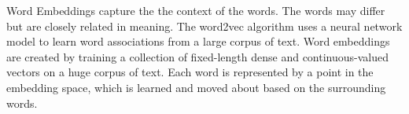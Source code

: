 Word Embeddings capture the the context of the words. The words may differ but are closely related in meaning. The word2vec algorithm uses a neural network model to learn word associations from a large corpus of text. Word embeddings are created by training a collection of fixed-length dense and continuous-valued vectors on a huge corpus of text. Each word is represented by a point in the embedding space, which is learned and moved about based on the surrounding words.             



\cite{chen_shen_huang_wang_2021}\cite{OpenTapioca}\cite{Weichselbraun}\cite{tagme}